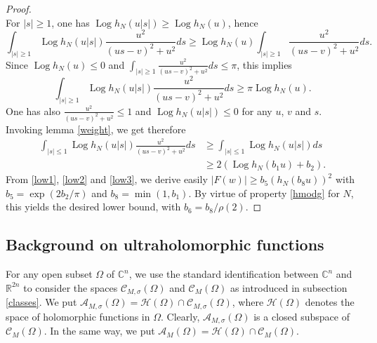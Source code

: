 \documentclass[a4paper]{amsart}
\theoremstyle{plain}
\theoremstyle{definition}
\theoremstyle{remark}
\DeclareMathOperator{\Log}{Log}
\begin{document}
\begin{proof}
\begin{equation}
\end{equation}
For $ \vert s\vert\geq 1 $, one has $ \Log h_N(u\vert s\vert)\geq\Log h_N(u) $, hence \begin{equation*}
\int_{\vert s\vert\geq 1}\Log h_N(u\vert s\vert)\frac{u^2}{(us-v)^2+u^2}ds\geq\Log h_N(u)  \int_{\vert s\vert\geq 1}\frac{u^2}{(us-v)^2+u^2}ds.
\end{equation*}
Since $ \Log h_N(u)\leq 0 $ and
$ \int_{\vert s\vert\geq 1}\frac{u^2}{(us-v)^2+u^2}ds\leq\pi $, this implies
\begin{equation}\label{low2}
\int_{\vert s\vert\geq 1}\Log h_N(u\vert s\vert)\frac{u^2}{(us-v)^2+u^2}ds\geq
\pi\Log h_N(u).
\end{equation}
One has also $ \frac{u^2}{(us-v)^2+u^2}\leq 1 $ and 
$ \Log h_N(u\vert s\vert)\leq 0 $ for any $ u $, $ v $ and $ s $. Invoking lemma \ref{weight}, we get therefore
\begin{equation}\label{low3}
\begin{split}
\int_{\vert s\vert\leq 1}\Log h_N(u\vert s\vert)\frac{u^2}{(us-v)^2+u^2}ds & \geq
\int_{\vert s\vert\leq 1}\Log h_N(u\vert s\vert)ds\\
& \geq 2(\Log h_N(b_1u)+b_2).
\end{split}
\end{equation}
From \eqref{low1}, \eqref{low2} and \eqref{low3}, we derive easily
$ \vert F(w)\vert\geq b_5(h_N(b_8u))^2 $ with $ b_5=\exp(2b_2/\pi) $ and
$ b_8=\min(1,b_1) $. By virtue of property \eqref{hmodg} for $ N $, this yields
the desired lower bound, with $ b_6=b_8/\rho(2) $.
\end{proof}

\subsection{Background on ultraholomorphic functions}\label{ultrahols}

For any open subset $ \Omega $ of $ \mathbb{C}^n $, we use the
standard identification between $ \mathbb{C}^n $ and $ \mathbb{R}^{2n} $ to
consider the spaces $ \mathcal{C}_{M,\sigma}(\Omega) $ and $ \mathcal{C}_M(\Omega) $ as introduced
in subsection \ref{classes}. We put  
$ \mathcal{A}_{M,\sigma}(\Omega)=\mathcal{H}(\Omega)\cap \mathcal{C}_{M,\sigma}(\Omega) $, where
$ \mathcal{H}(\Omega) $ denotes the space of holomorphic functions in $ \Omega $. 
Clearly, 
$ \mathcal{A}_{M,\sigma}(\Omega) $
is a closed subspace of $ \mathcal{C}_M(\Omega) $. In the same way, we put
$ \mathcal{A}_M(\Omega)=\mathcal{H}(\Omega)\cap \mathcal{C}_M(\Omega) $. 
\end{document}
